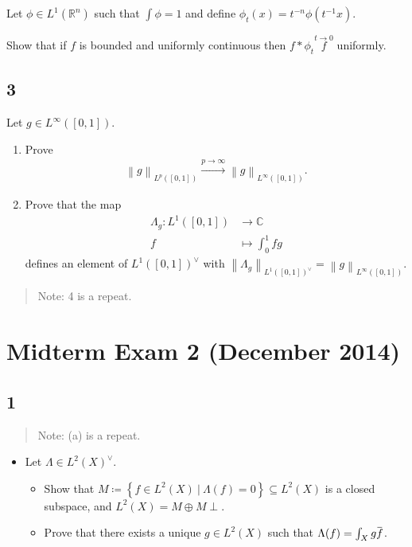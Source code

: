 Let \(\phi\in L^1({\mathbb{R}}^n)\) such that \(\int \phi = 1\) and
define \(\phi_t(x) = t^{-n}\phi(t^{-1}x)\).

Show that if \(f\) is bounded and uniformly continuous then
\(f\ast \phi_t \overset{t\to 0} f\) uniformly.

\hypertarget{section-1}{%
\subsection{3}\label{section-1}}

Let \(g\in L^\infty([0, 1])\).

\begin{enumerate}
\def\labelenumi{\alph{enumi}.}
\item
  Prove
  \begin{align*}     {\left\lVert {g} \right\rVert}_{L^p([0, 1])}  \overset{p\to\infty}\to {\left\lVert {g} \right\rVert}_{L^\infty([0, 1])}     .\end{align*}
\item
  Prove that the map
  \begin{align*}     \Lambda_g: L^1([0, 1]) &\to {\mathbb{C}}\\     f &\mapsto \int_0^1 fg     \end{align*}
  defines an element of \(L^1([0, 1])^\vee\) with
  \({\left\lVert {\Lambda_g} \right\rVert}_{L^1([0, 1])^\vee}= {\left\lVert {g} \right\rVert}_{L^\infty([0, 1])}\).
\end{enumerate}

\begin{quote}
Note: 4 is a repeat.
\end{quote}

\hypertarget{midterm-exam-2-december-2014}{%
\section{Midterm Exam 2 (December
2014)}\label{midterm-exam-2-december-2014}}

\hypertarget{section-2}{%
\subsection{1}\label{section-2}}

\begin{quote}
Note: (a) is a repeat.
\end{quote}

\begin{itemize}
\tightlist
\item
  Let \(\Lambda\in L^2(X)^\vee\).

  \begin{itemize}
  \tightlist
  \item
    Show that
    \(M\coloneqq\left\{{f\in L^2(X) {~\mathrel{\Big|}~}\Lambda(f) = 0}\right\} \subseteq L^2(X)\)
    is a closed subspace, and \(L^2(X) = M \oplus M\perp\).
  \item
    Prove that there exists a unique \(g\in L^2(X)\) such that
    \(\Lambda(f) = \int_X g \mkern 1.5mu\overline{\mkern-1.5muf\mkern-1.5mu}\mkern 1.5mu\).
  \end{itemize}
\end{itemize}

